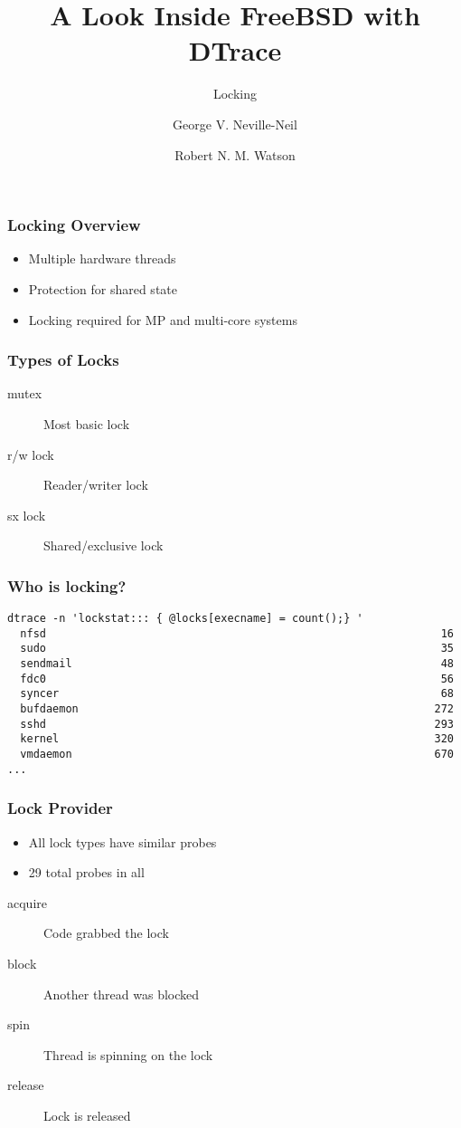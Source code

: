 \documentclass[pdftex]{beamer}
\begin{document}

\title{A Look Inside FreeBSD with DTrace}
\subtitle{Locking}
\author[shortname]{George V. Neville-Neil \and Robert N. M. Watson}

\begin{frame}
  \frametitle{Locking Overview}
  \begin{itemize}
  \item Multiple hardware threads
  \item Protection for shared state
  \item Locking required for MP and multi-core systems
  \end{itemize}
\end{frame}

\begin{frame}
  \frametitle{Types of Locks}
  \begin{description}
  \item[mutex] Most basic lock
  \item[r/w lock] Reader/writer lock
  \item[sx lock] Shared/exclusive lock
  \end{description}
\end{frame}

\begin{frame}[fragile]
  \frametitle{Who is locking?}
\begin{verbatim}
dtrace -n 'lockstat::: { @locks[execname] = count();} '
  nfsd                                                             16
  sudo                                                             35
  sendmail                                                         48
  fdc0                                                             56
  syncer                                                           68
  bufdaemon                                                       272
  sshd                                                            293
  kernel                                                          320
  vmdaemon                                                        670
...
\end{verbatim}
\end{frame}

\begin{frame}
  \frametitle{Lock Provider}
  \begin{itemize}
  \item All lock types have similar probes
  \item 29 total probes in all
  \end{itemize}
  \begin{description}
  \item[acquire] Code grabbed the lock
  \item[block] Another thread was blocked
  \item[spin] Thread is spinning on the lock
  \item[release] Lock is released
  \end{description}
\end{frame}
\end{document}
